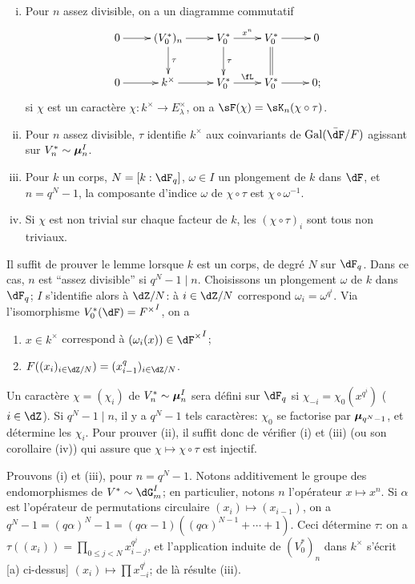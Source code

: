 \begin{lemma_}\label{VI:4-9}
\leavevmode
\begin{enumerate}[(i)]
  \item Pour $n$ assez divisible, on a un diagramme commutatif 
    \[\xymatrix{
      0 \ar[r] 
        & (V_0^\ast)_n \ar[r] \ar[d]^-\tau 
        & V_0^\ast \ar[r]^-{x^n} \ar[d]^-\tau 
        & V_0^\ast \ar[r] \ar@{=}[d] 
        & 0 \\
      0 \ar[r] 
        & k^\times \ar[r] 
        & V_0^\ast \ar[r]^-\fL 
        & V_0^\ast \ar[r] 
        & 0 \text{;} 
    }\]
    si $\chi$ est un caractère $\chi:k^\times \to E_\lambda^\times$, on a 
    $\sF(\chi) = \sK_n(\chi\circ\tau)$. 
  \item Pour $n$ assez divisible, $\tau$ identifie $k^\times$ aux coinvariants 
    de $\gal(\bar\dF/F)$ agissant sur $V_n^\ast\sim {\bm\mu}_n^I$. 
  \item Pour $k$ un corps, $N=[k:\dF_q]$, $\omega\in I$ un plongement de $k$ 
    dans $\dF$, et $n=q^N-1$, la composante d'indice $\omega$ de 
    $\chi\circ\tau$ est $\chi\circ \omega^{-1}$. 
  \item Si $\chi$ est non trivial sur chaque facteur de $k$, les 
    $(\chi\circ \tau)_i$ sont tous non triviaux. 
\end{enumerate}
\end{lemma_}

Il suffit de prouver le lemme lorsque $k$ est un corps, de degré $N$ sur 
$\dF_q$. Dans ce cas, $n$ est ``assez divisible'' si $q^N-1\mid n$. 
Choisissons un plongement $\omega$ de $k$ dans $\dF_q$; $I$ s'identifie alors 
à $\dZ/N$: à $i\in \dZ/N$ correspond $\omega_i=\omega^{q^i}$. Via 
l'isomorphisme $V_0^\ast(\dF) = {F^\times}^I$, on a 
\begin{enumerate}[\indent a)]
  \item $x\in k^\times$ correspond à $(\omega_i(x))\in {\dF^\times}^I$; 
  \item $F((x_i)_{i\in \dZ/N})=(x_{i-1}^q)_{i\in \dZ/N}$. 
\end{enumerate}

Un caractère $\chi=(\chi_i)$ de $V_n^\ast\sim {\bm\mu}_n^I$ sera défini sur 
$\dF_q$ si $\chi_{-i} =\chi_0(x^{q^i})$ ($i\in \dZ$). Si $q^N-1\mid n$, il y a 
$q^N-1$ tels caractères: $\chi_0$ se factorise par ${\bm\mu}_{q^N-1}$, et 
détermine les $\chi_i$. Pour prouver (ii), il suffit donc de vérifier (i) 
et (iii) (ou son corollaire (iv)) qui assure que $\chi\mapsto \chi\circ \tau$ 
est injectif. 

Prouvons (i) et (iii), pour $n=q^N-1$. Notons additivement le groupe des 
endomorphismes de $V^\ast\sim \dG_m^I$; en particulier, notons $n$ 
l'opérateur $x\mapsto x^n$. Si $\alpha$ est l'opérateur de permutations 
circulaire $(x_i)\mapsto (x_{i-1})$, on a 
$q^N-1=(q\alpha)^N-1 = (q\alpha-1)((q\alpha)^{N-1}+\cdots + 1)$. Ceci 
détermine $\tau$: on a $\tau((x_i)) = \prod_{0\leqslant j<N} x_{i-j}^{q^j}$, 
et l'application induite de $(V_0^\ast)_n$ dans $k^\times$ s'écrit [a) 
ci-dessus] $(x_i)\mapsto \prod x_{-i}^{q^i}$; de là résulte (iii). 





